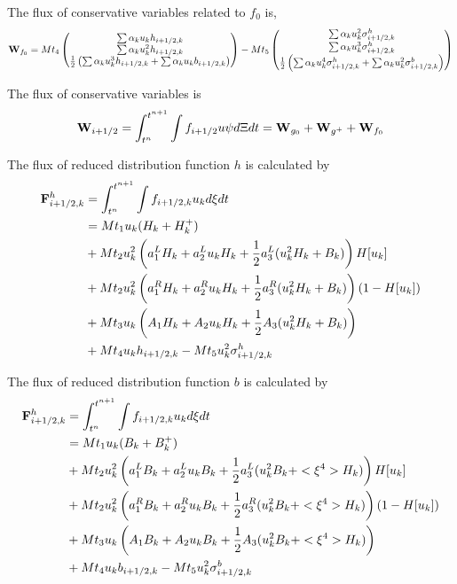 \documentclass[a4paper]{book}
\begin{document}
The flux of conservative variables related to $f_0$ is,
$$
{\bf W}_{f_0} = Mt_4
\begin{pmatrix}
    \sum\alpha_k u_k h_{i+1/2,k}\\ \sum\alpha_k u_k^2 h_{i+1/2,k}\\ \frac{1}{2}\left(\sum\alpha_k u_k^3 h_{i+1/2,k}+\sum\alpha_k u_k b_{i+1/2,k}\right)
\end{pmatrix}
-Mt_5
\begin{pmatrix}
    \sum\alpha_k u_k^2 \sigma_{i+1/2,k}^h\\ \sum\alpha_k u_k^3 \sigma_{i+1/2,k}^h\\ \frac{1}{2}\left(\sum\alpha_k u_k^4 \sigma_{i+1/2,k}^h+\sum\alpha_k u_k^2 \sigma_{i+1/2,k}^b\right)
\end{pmatrix}
$$

The flux of conservative variables is
$${\bf W}_{i+1/2} = \int_{t^n}^{t^{n+1}}\int f_{i+1/2}u\psi d\Xi dt={\bf W}_{g_0}+{\bf W}_{g^+}+{\bf W}_{f_0}$$

The flux of reduced distribution function $h$ is calculated by
$$
\begin{aligned}
    {\bf F}_{i+1/2,k}^h &= \int_{t^n}^{t^{n+1}}\int f_{i+1/2,k}u_k d\xi dt\\
                        &= Mt_1 u_k (H_k+H_k^+)\\
                        &+ Mt_2 u_k^2 \left(a_1^L H_k + a_2^L u_k H_k + \frac{1}{2}a_3^L(u_k^2 H_k+B_k)\right)H[u_k]\\
                        &+ Mt_2 u_k^2 \left(a_1^R H_k + a_2^R u_k H_k + \frac{1}{2}a_3^R(u_k^2 H_k+B_k)\right)(1-H[u_k])\\
                        &+ Mt_3 u_k \left(A_1 H_k + A_2 u_k H_k + \frac{1}{2}A_3(u_k^2 H_k+B_k)\right)\\
                        &+ Mt_4 u_k h_{i+1/2,k}-Mt_5 u_k^2 \sigma_{i+1/2,k}^h
\end{aligned} 
$$

The flux of reduced distribution function $b$ is calculated by
$$
\begin{aligned}
    {\bf F}_{i+1/2,k}^h &= \int_{t^n}^{t^{n+1}}\int f_{i+1/2,k}u_k d\xi dt\\
                        &= Mt_1 u_k (B_k+B_k^+)\\
                        &+ Mt_2 u_k^2 \left(a_1^L B_k + a_2^L u_k B_k + \frac{1}{2}a_3^L(u_k^2 B_k+<\xi^4>H_k)\right)H[u_k]\\
                        &+ Mt_2 u_k^2 \left(a_1^R B_k + a_2^R u_k B_k + \frac{1}{2}a_3^R(u_k^2 B_k+<\xi^4>H_k)\right)(1-H[u_k])\\
                        &+ Mt_3 u_k \left(A_1 B_k + A_2 u_k B_k + \frac{1}{2}A_3(u_k^2 B_k+<\xi^4>H_k)\right)\\
                        &+ Mt_4 u_k b_{i+1/2,k}-Mt_5 u_k^2 \sigma_{i+1/2,k}^b
\end{aligned} 
$$
\end{document}
